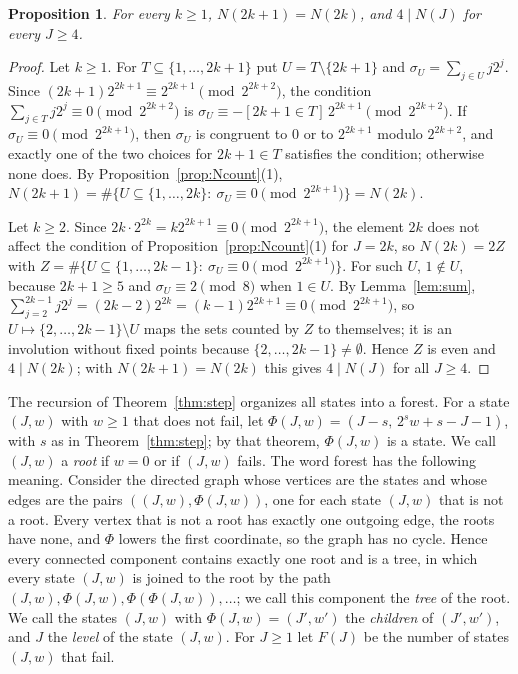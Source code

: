 \documentclass[11pt]{amsart}
\newtheorem{Proposition}[Theorem]{Proposition}
\theoremstyle{definition}
\begin{document}
\begin{Proposition}
\label{prop:Npairs}
For every $k\ge1$, $N(2k+1)=N(2k)$, and $4\mid N(J)$ for every $J\ge4$.
\end{Proposition}
\begin{proof}
Let $k\ge1$. For $T\subseteq\{1,\dots,2k+1\}$ put $U=T\setminus\{2k+1\}$ and $\sigma_U=\sum_{j\in U}j2^j$. Since $(2k+1)2^{2k+1}\equiv2^{2k+1}\pmod{2^{2k+2}}$, the condition $\sum_{j\in T}j2^j\equiv0\pmod{2^{2k+2}}$ is $\sigma_U\equiv-[2k+1\in T]\,2^{2k+1}\pmod{2^{2k+2}}$. If $\sigma_U\equiv0\pmod{2^{2k+1}}$, then $\sigma_U$ is congruent to $0$ or to $2^{2k+1}$ modulo $2^{2k+2}$, and exactly one of the two choices for $2k+1\in T$ satisfies the condition; otherwise none does. By Proposition~\ref{prop:Ncount}(1), $N(2k+1)=\#\{U\subseteq\{1,\dots,2k\}:\ \sigma_U\equiv0\pmod{2^{2k+1}}\}=N(2k)$.

Let $k\ge2$. Since $2k\cdot2^{2k}=k2^{2k+1}\equiv0\pmod{2^{2k+1}}$, the element $2k$ does not affect the condition of Proposition~\ref{prop:Ncount}(1) for $J=2k$, so $N(2k)=2Z$ with $Z=\#\{U\subseteq\{1,\dots,2k-1\}:\ \sigma_U\equiv0\pmod{2^{2k+1}}\}$. For such $U$, $1\notin U$, because $2k+1\ge5$ and $\sigma_U\equiv2\pmod8$ when $1\in U$. By Lemma~\ref{lem:sum}, $\sum_{j=2}^{2k-1}j2^j=(2k-2)2^{2k}=(k-1)2^{2k+1}\equiv0\pmod{2^{2k+1}}$, so $U\mapsto\{2,\dots,2k-1\}\setminus U$ maps the sets counted by $Z$ to themselves; it is an involution without fixed points because $\{2,\dots,2k-1\}\neq\emptyset$. Hence $Z$ is even and $4\mid N(2k)$; with $N(2k+1)=N(2k)$ this gives $4\mid N(J)$ for all $J\ge4$.
\end{proof}

The recursion of Theorem~\ref{thm:step} organizes all states into a forest. For a state $(J,w)$ with $w\ge1$ that does not fail, let $\Phi(J,w)=(J-s,\,2^sw+s-J-1)$, with $s$ as in Theorem~\ref{thm:step}; by that theorem, $\Phi(J,w)$ is a state. We call $(J,w)$ a \emph{root} if $w=0$ or if $(J,w)$ fails. The word forest has the following meaning. Consider the directed graph whose vertices are the states and whose edges are the pairs $((J,w),\Phi(J,w))$, one for each state $(J,w)$ that is not a root. Every vertex that is not a root has exactly one outgoing edge, the roots have none, and $\Phi$ lowers the first coordinate, so the graph has no cycle. Hence every connected component contains exactly one root and is a tree, in which every state $(J,w)$ is joined to the root by the path $(J,w),\Phi(J,w),\Phi(\Phi(J,w)),\dots$; we call this component the \emph{tree} of the root. We call the states $(J,w)$ with $\Phi(J,w)=(J',w')$ the \emph{children} of $(J',w')$, and $J$ the \emph{level} of the state $(J,w)$. For $J\ge1$ let $F(J)$ be the number of states $(J,w)$ that fail.
\end{document}
